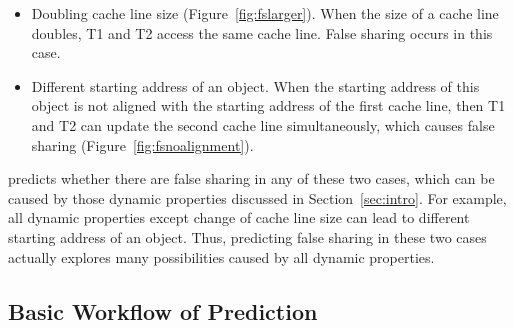 \begin{itemize}
\item
Doubling cache line size (Figure~\ref{fig:fslarger}). When the size of a
cache line doubles,
T1 and T2 access the same cache line. False sharing occurs in this case.

\item
Different starting address of an object. 
When the starting address of this object is not aligned with the starting address of 
the first cache line, 
then T1 and T2 can update the second cache line simultaneously, 
which causes false sharing (Figure~\ref{fig:fsnoalignment}). 
\end{itemize} 

 predicts whether there are false sharing 
in any of these two cases, which can
be caused by those dynamic properties discussed in Section~\ref{sec:intro}.
For example, all dynamic properties except change of cache line size 
can lead to different starting address 
of an object. 
Thus, predicting false sharing in these two cases actually 
explores many possibilities caused by all dynamic properties.


\subsection{Basic Workflow of Prediction}
\label{sec:predictionmechanism} 

